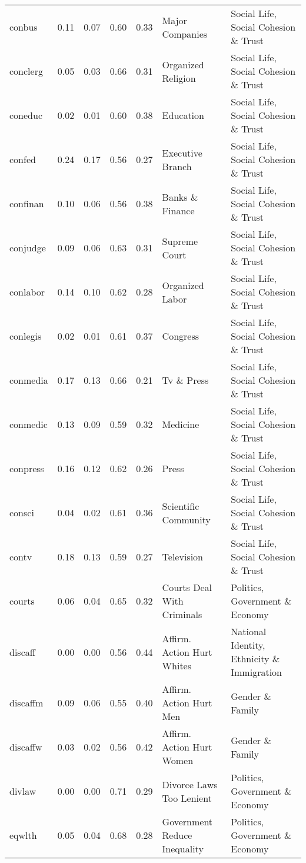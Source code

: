 \begin{longtable}{l|rrrrll}
conbus & 0.11 & 0.07 & 0.60 & 0.33 & Major Companies & Social Life, Social Cohesion \& Trust \\ 
conclerg & 0.05 & 0.03 & 0.66 & 0.31 & Organized Religion & Social Life, Social Cohesion \& Trust \\ 
coneduc & 0.02 & 0.01 & 0.60 & 0.38 & Education & Social Life, Social Cohesion \& Trust \\ 
confed & 0.24 & 0.17 & 0.56 & 0.27 & Executive Branch & Social Life, Social Cohesion \& Trust \\ 
confinan & 0.10 & 0.06 & 0.56 & 0.38 & Banks \& Finance & Social Life, Social Cohesion \& Trust \\ 
conjudge & 0.09 & 0.06 & 0.63 & 0.31 & Supreme Court & Social Life, Social Cohesion \& Trust \\ 
conlabor & 0.14 & 0.10 & 0.62 & 0.28 & Organized Labor & Social Life, Social Cohesion \& Trust \\ 
conlegis & 0.02 & 0.01 & 0.61 & 0.37 & Congress & Social Life, Social Cohesion \& Trust \\ 
conmedia & 0.17 & 0.13 & 0.66 & 0.21 & Tv \& Press & Social Life, Social Cohesion \& Trust \\ 
conmedic & 0.13 & 0.09 & 0.59 & 0.32 & Medicine & Social Life, Social Cohesion \& Trust \\ 
conpress & 0.16 & 0.12 & 0.62 & 0.26 & Press & Social Life, Social Cohesion \& Trust \\ 
consci & 0.04 & 0.02 & 0.61 & 0.36 & Scientific Community & Social Life, Social Cohesion \& Trust \\ 
contv & 0.18 & 0.13 & 0.59 & 0.27 & Television & Social Life, Social Cohesion \& Trust \\ 
courts & 0.06 & 0.04 & 0.65 & 0.32 & Courts Deal With Criminals & Politics, Government \& Economy \\ 
discaff & 0.00 & 0.00 & 0.56 & 0.44 & Affirm. Action Hurt Whites & National Identity, Ethnicity \& Immigration \\ 
discaffm & 0.09 & 0.06 & 0.55 & 0.40 & Affirm. Action Hurt Men & Gender \& Family \\ 
discaffw & 0.03 & 0.02 & 0.56 & 0.42 & Affirm. Action Hurt Women & Gender \& Family \\ 
divlaw & 0.00 & 0.00 & 0.71 & 0.29 & Divorce Laws Too Lenient & Politics, Government \& Economy \\ 
eqwlth & 0.05 & 0.04 & 0.68 & 0.28 & Government Reduce Inequality & Politics, Government \& Economy \\ 

\end{longtable}
